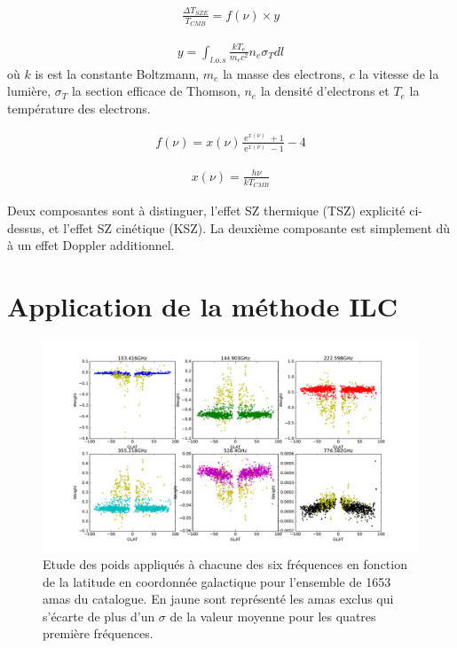 \documentclass[a4paper,11pt]{article}
\DeclareMathOperator{\e}{e}
\begin{document}
\begin{align*}
  \frac{\Delta T_{SZE}}{T_{CMB}} = f(\nu) \times  y
\end{align*}

\begin{align*}
  y = \int_{l.o.s} \frac{kT_e}{m_e c^2} n_e \sigma_T dl 
\end{align*}
où $k$ is est la constante Boltzmann, $m_e$ la masse des electrons, $c$
la vitesse de la lumière, $\sigma_T$ la section efficace de Thomson, 
$n_e$ la densité d'electrons et $T_e$ la température des electrons.

\begin{align*}
  f(\nu) = x(\nu) \frac{\e^{x(\nu)}+1}{\e^{x(\nu)}-1} - 4
\end{align*}

\begin{align*}
  x(\nu) = \frac{h \nu}{k T_{CMB}}
\end{align*}

Deux composantes sont à distinguer, l'effet SZ thermique (TSZ)
explicité ci-dessus, et l'effet SZ cinétique (KSZ). La deuxième composante est simplement dù à un effet
Doppler additionnel. 

\section{Application de la méthode ILC}

\begin{figure}[b!]
  \centering
  \label{w_lat}
  \includegraphics[width=6in]{w_lat.pdf}
  \caption{Etude des poids appliqués à chacune des six fréquences en
    fonction de la latitude en coordonnée galactique pour
  l'ensemble de 1653 amas du catalogue. En jaune sont représenté les
  amas exclus qui s'écarte de plus d'un $\sigma$ de la valeur moyenne
  pour les quatres première fréquences.}
\end{figure}
\end{document}
